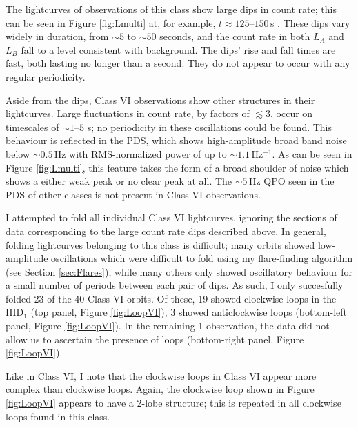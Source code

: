 \par The lightcurves of observations of this class show large dips in count rate; this can be seen in Figure \ref{fig:Lmulti} at, for example, $t\approx125$--$150$\,s .  These dips vary widely in duration, from $\sim5$ to $\sim50$ seconds, and the count rate in both $L_A$ and $L_B$ fall to a level consistent with background.  The dips' rise and fall times are fast, both lasting no longer than a second.  They do not appear to occur with any regular periodicity.
\par Aside from the dips, Class VI observations show other structures in their lightcurves.  Large fluctuations in count rate, by factors of $\lesssim3$, occur on timescales of $\sim1\mbox{--}5$ s; no periodicity in these oscillations could be found.  This behaviour is reflected in the PDS, which shows high-amplitude broad band noise below $\sim0.5$\,Hz with RMS-normalized power \citep{Belloni_RMSNorm} of up to $\sim1.1 $\,Hz$^{-1}$.  As can be seen in Figure \ref{fig:Lmulti}, this feature takes the form of a broad shoulder of noise which shows a either weak peak or no clear peak at all.  The $\sim5$\,Hz QPO seen in the PDS of other classes is not present in Class VI observations.
\par I attempted to fold all individual Class VI lightcurves, ignoring the sections of data corresponding to the large count rate dips described above.  In general, folding lightcurves belonging to this class is difficult; many orbits showed low-amplitude oscillations which were difficult to fold using my flare-finding algorithm (see Section \ref{sec:Flares}), while many others only showed oscillatory behaviour for a small number of periods between each pair of dips.  As such, I only succesfully folded 23 of the 40 Class VI orbits.  Of these, 19 showed clockwise loops in the HID$_1$ (top panel, Figure \ref{fig:LoopVI}), 3 showed anticlockwise loops (bottom-left panel, Figure \ref{fig:LoopVI}).  In the remaining 1 observation, the data did not allow us to ascertain the presence of loops (bottom-right panel, Figure \ref{fig:LoopVI}).
\par Like in Class VI, I note that the clockwise loops in Class VI appear more complex than clockwise loops.  Again, the clockwise loop shown in Figure \ref{fig:LoopVI} appears to have a 2-lobe structure; this is repeated in all clockwise loops found in this class.


